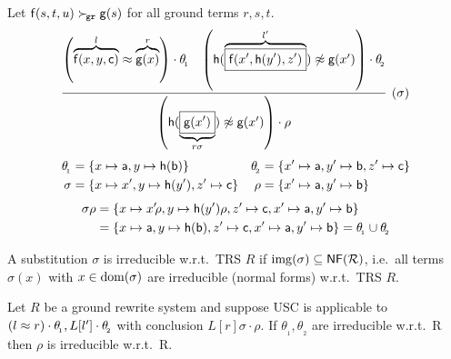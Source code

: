    \begin{example}
    Let \( \mathsf{f}(s,t,u)\mathrel\succ_{\!\mathtt{gr}}\mathsf{g}(s) \) for all ground terms
   \( r,s,t \).
   \begin{gather*}
       \infer[(\sigma)]{
           \left(
               \mh(\underbrace{
                   \boxed{\mg(x')}
                    }_{r\sigma})\mNE\mg(x')
               \right)\cdot\rho
        }{
           \left(
               \overbrace{\mf(x,y,\mc)}^{l}
               \mEQ
               \overbrace{\mg(x)}^r
           \right)\cdot \theta_{\!_1}
        & \left(
           \mh(\overbrace{
               \boxed{\mf(x',\mh(y'), z')}
                }^{l'})\mNE\mg(x')
           \right)\cdot \theta_{\!_2}
        }
   \end{gather*}
   \begin{align*}
       \theta_{\!_1} &= \{x\mapsto\mathsf{a}, y\mapsto\mathsf{h}(\mathsf{b})\} &
       \theta_{\!_2} &= \{x'\mapsto\mathsf{a}, y'\mapsto\mathsf{b}, z'\mapsto\mathsf{c} \}
        \\
        \sigma &= \{x\mapsto x',y\mapsto\mathsf{h}(y'),z'\mapsto\mathsf{c} \}
          &
        \rho &=\{ x'\mapsto \mathsf{a}, y'\mapsto \mathsf{b} \}
   \end{align*}
   \begin{align*}
   \sigma\rho &= \{
    x\mapsto x'\!\rho,y\mapsto\mathsf{h}(y')\rho,z'\mapsto\mathsf{c},
    x'\mapsto \mathsf{a}, y'\mapsto \mathsf{b}
    \}
    \\
    &= \{ x\mapsto \mathsf{a},y\mapsto\mathsf{h}(\mathsf{b}),z'\mapsto\mathsf{c},
    x'\mapsto \mathsf{a}, y'\mapsto \mathsf{b}
        \}
    = \theta_{\!_1}\cup\theta_{\!_2}
   \end{align*}
\end{example}

\begin{definition}
    A substitution \( \sigma \) is irreducible w.r.t.~TRS \( R \)
    if
    \( \operatorname{img}(\sigma)\subseteq\mathsf{NF} (\mathcal{R}) \),
    i.e.~all terms \(\sigma(x)\) with
    \( x\in\operatorname{dom}(\sigma) \) are irreducible (normal forms) w.r.t.~TRS \(R\).
\end{definition}

   \begin{lemma}
        Let \( R \) be a ground rewrite system and suppose USC is applicable to
       \( (l\approx r)\cdot\theta_{\!_1}, L[l']\cdot\theta_{\!_2} \)
        with conclusion
       \( L[r]\sigma\cdot\rho \).
        If \( \theta_{\!_1}, \theta_{\!_2} \) are irreducible w.r.t.~R
        then \( \rho \) is irreducible w.r.t.~R.
   \end{lemma}

